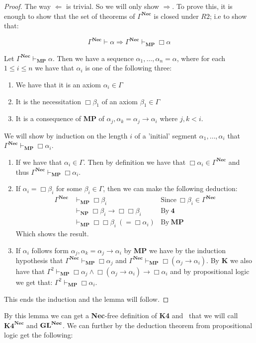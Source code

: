 \documentclass[../main.tex]{subfiles}
\begin{document}
\begin{proof}
	The way $\Leftarrow$ is trivial. So we will only show $\Rightarrow$.
	To prove this, it is enough to show that the set of theorems of
	$\Gamma^{\textbf{Nec}}$ is closed under $R2$; i.e to show that:

\[\Gamma^{\textbf{Nec}}\vdash\alpha\Rightarrow\Gamma^{\textbf{Nec}}\vdash_{\textbf{MP}}\Box\alpha\]

Let $\Gamma^{\textbf{Nec}}\vdash_{\textbf{MP}}\alpha$. Then we have a sequence
	$\alpha_1,\ldots,\alpha_n=\alpha$, where for each $1\leq i\leq n$ we
	have that $\alpha_i$ is one of the following three:
	\begin{enumerate}
		\item We have that it is an axiom $\alpha_i\in\Gamma$ 
		\item It is the necessitation  $\Box\beta_1$ of an axiom
			$\beta_1\in\Gamma$
		\item It is a consequence of \textbf{MP} of
			$\alpha_j,\alpha_k=\alpha_j\rightarrow\alpha_i$
			where $j,k<i$.
	\end{enumerate}
	We will show  by induction on the length $i$ of a 'initial' segment
	$\alpha_1,\ldots,\alpha_i$ that
	$\Gamma^{\textbf{Nec}}\vdash_{\textbf{MP}}\Box\alpha_i$. 
	\begin{enumerate}
		\item If we have that $\alpha_i\in\Gamma$. Then by definition
			we have that $\Box\alpha_i\in\Gamma^{\textbf{Nec}}$ and thus
			$\Gamma^{\textbf{Nec}}\vdash_{\textbf{MP}}\Box\alpha_i$.
		\item If $\alpha_i=\Box\beta_i$ for some $\beta_i\in\Gamma$,
			then we can make the following deduction:
			\begin{align*}
				\Gamma^{\textbf{Nec}}&\vdash_{\textbf{MP}}\Box\beta_i &\text{Since}\
				\Box\beta_i\in\Gamma^{\textbf{Nec}}\\
						     &\vdash_{\textbf{NP}}\Box\beta_i\rightarrow\Box\Box\beta_i
					&\text{By}\ \textbf{4}\\
					&\vdash_{\textbf{MP}}\Box\Box\beta_i\ (=\Box\alpha_i) 
					&\text{By}\ \textbf{MP}
			\end{align*}
			Which shows the result.
		\item If $\alpha_i$ follows form
			$\alpha_j,\alpha_k=\alpha_j\rightarrow\alpha_i$ by
			\textbf{MP} we have by the induction hypothesis that
			$\Gamma^{\textbf{Nec}}\vdash_{\textbf{MP}}\Box\alpha_j$ and
			$\Gamma^{\textbf{Nec}}\vdash_{\textbf{MP}}\Box(\alpha_j\rightarrow\alpha_i)$. By
			\textbf{K} we also have that
			$\Gamma^2\vdash_{\textbf{MP}}\Box\alpha_j\wedge\Box(\alpha_j\rightarrow\alpha_i)\rightarrow\Box\alpha_i$
			and by propositional logic we get that:
			$\Gamma^2\vdash_{\textbf{MP}}\Box\alpha_i$.
	\end{enumerate}
	This ends the induction and the lemma will follow.
\end{proof}
By this lemma we can get a \textbf{Nec}-free definition of \textbf{K4} and \GL\  that we will call
$\textbf{K4}^{\textbf{Nec}}$ and $\text{\textbf{GL}}^{\textbf{Nec}}$. We can further by the deduction theorem from propositional logic get
the following:
\end{document}
